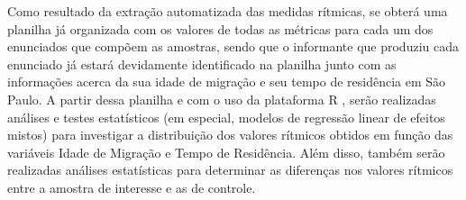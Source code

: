 \documentclass[
		a4paper,	%
		12pt,		%
		]{article}	%
\begin{document}
	Como resultado da extração automatizada das medidas rítmicas, se obterá uma
	planilha já organizada com os valores de todas as métricas para cada um dos
	enunciados que compõem as amostras, sendo que o informante que produziu cada
	enunciado já estará devidamente identificado na planilha junto com as
	informações acerca da sua idade de migração e seu tempo de residência em São
	Paulo. A partir dessa planilha e com o uso da plataforma R
	\citep{RCoreTeam2019}, serão realizadas análises e testes estatísticos (em
	especial, modelos de regressão linear de efeitos mistos) para investigar a
	distribuição dos valores rítmicos obtidos em função das variáveis Idade de
	Migração e Tempo de Residência. Além disso, também serão realizadas análises
	estatísticas para determinar as diferenças nos valores rítmicos entre a
	amostra de interesse e as de controle. 
	
	{ %
		\printbibliography
	}
\end{document}
